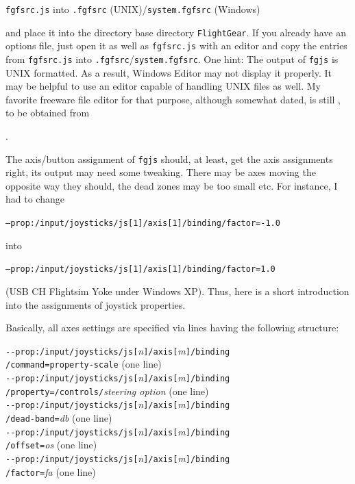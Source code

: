 \noindent
 \texttt{fgfsrc.js} into \texttt{.fgfsrc} (UNIX)/\texttt{system.fgfsrc} (Windows)
 \medskip

\noindent
and place it into the directory \FlightGear{} base directory \texttt{FlightGear}. If you already have an options file, just open it as well as \texttt{fgfsrc.js} with an editor and copy the entries from \texttt{fgfsrc.js} into \texttt{.fgfsrc}/\texttt{system.fgfsrc}. One hint: The output of \texttt{fgjs} is UNIX formatted. As a result, Windows Editor may not display it properly. It may be helpful to use an editor capable of handling UNIX files as well. My favorite freeware file editor for that purpose, although somewhat dated, is still , to be obtained from

.

The axis/button assignment of \texttt{fgjs} should, at least, get the axis assignments right, its output may need some tweaking. There may be axes moving the opposite way they should, the dead zones may be too small etc. For instance, I had to change

\texttt{--prop:/input/joysticks/js[1]/axis[1]/binding/factor=-1.0}

into

\texttt{--prop:/input/joysticks/js[1]/axis[1]/binding/factor=1.0}

(USB CH Flightsim Yoke under Windows XP). Thus, here is a short introduction into the assignments of joystick properties.

Basically, all axes settings are specified via lines having the following structure:
 \medskip

\noindent
\texttt{-$ $-prop:/input/joysticks/js[}\textit{n}\texttt{]/axis[}\textit{m}\texttt{]/binding}\\
\texttt{/command=property-scale} (one line)\\
\texttt{-$ $-prop:/input/joysticks/js[}\textit{n}\texttt{]/axis[}\textit{m}\texttt{]/binding}\\
\texttt{/property=/controls/}\textit{steering option} (one line)\\
\texttt{-$ $-prop:/input/joysticks/js[}\textit{n}\texttt{]/axis[}\textit{m}\texttt{]/binding}\\
\texttt{/dead-band=}\textit{db} (one line)\\
\texttt{-$ $-prop:/input/joysticks/js[}\textit{n}\texttt{]/axis[}\textit{m}\texttt{]/binding}\\
\texttt{/offset=}\textit{os} (one line)\\
\texttt{-$ $-prop:/input/joysticks/js[}\textit{n}\texttt{]/axis[}\textit{m}\texttt{]/binding}\\
\texttt{/factor=}\textit{fa} (one line)\\
\medskip

